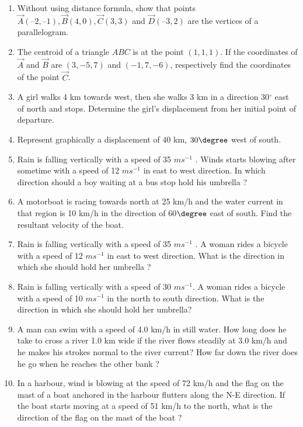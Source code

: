\begin{enumerate}[label=\thesubsection.\arabic*, ref=\thesubsection.\theenumi]
\item Without using distance formula,  show that points $\vec{A}(– 2,  – 1),  \vec{B}(4,  0),  \vec{C}(3,  3)$ and $\vec{D}(–3,  2)$ are the vertices of a parallelogram.
\label{chapters/11/10/1/9}
\\
\solution

\item The centroid of a triangle $ABC$ is at the point $(1, 1, 1)$. If the coordinates of $\vec{A}$ and $\vec{B}$ are $(3, -5, 7)$ and $(-1, 7, -6)$,  respectively find the coordinates of the point $\vec{C}$.
\item A girl walks 4 km towards west,  then she walks 3 km in a direction 30$^{\circ}$ east of north and stops. Determine the girl's displacement from her initial point of departure.\\
	\solution
		
\item Represent graphically a displacement of $40$ km,  $30\degree$ west of south.
	\item Rain is falling vertically with a speed of 35 $m s^{-1}$
. Winds starts blowing after sometime with a speed of 12 $m s^{-1}$ in
east to west direction. In which direction should a boy waiting at a bus stop hold his umbrella ?
%
\item A motorboat is racing towards north at 25 km/h and the water current in that region is 10 km/h in the direction of 60$\degree$ east of south. Find the resultant velocity of the boat.
\item Rain is falling vertically with a speed of 35 $m s^{-1}$
. A woman rides a bicycle with a speed of 12 $ms^{-1}$ in east to west
direction. What is the direction in which she should hold her umbrella ?
\item Rain is falling vertically with a speed of 30 $m s^{-1}$. A woman rides a bicycle with a speed  of 10 $m s^{-1}$ in the north to south direction. What is the direction in which she should
hold her umbrella?
\item A man can swim with a speed of 4.0 km/h in still water. How long does he take to cross a river 1.0 km wide if the river flows steadily at 3.0 km/h and he makes his strokes normal to the river current? How far down the river does he go when he reaches the other bank ?
\item In a harbour,  wind is blowing at the speed of 72 km/h and the flag on the mast of a boat anchored in the harbour flutters along the N-E direction. If the boat starts moving at a speed of 51 km/h to the north,  what is the direction of the flag on the mast of the boat ?
\end{enumerate}
